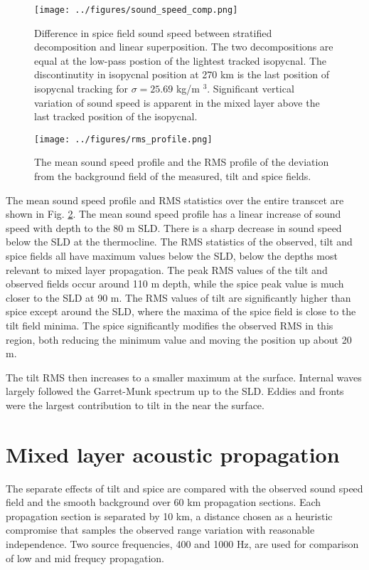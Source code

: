 \documentclass[preprint,NumberedRefs]{JASA}
\begin{document}
\begin{figure}
\texttt{[image: ../figures/sound\_speed\_comp.png]}
    \caption{\label{fig:c_diff}{Difference in spice field sound speed between stratified decomposition and linear superposition. The two decompositions are equal at the low-pass postion of the lightest tracked isopycnal. The discontinutity in isopycnal position at 270 km is the last position of isopycnal tracking for $\sigma=25.69$ kg/m $^3$. Significant vertical variation of sound speed is apparent in the mixed layer above the last tracked position of the isopycnal.}}
\end{figure}


\begin{figure}
\texttt{[image: ../figures/rms\_profile.png]}
    \caption{\label{fig:c_rms}{The mean sound speed profile and the RMS profile of the deviation from the background field of the measured, tilt and spice fields. }}
\end{figure}

The mean sound speed profile and RMS statistics over the entire transcet are shown in Fig. \ref{fig:c_rms}. The mean sound speed profile has a linear increase of sound speed with depth to the 80 m SLD. There is a sharp decrease in sound speed below the SLD at the thermocline. The RMS statistics of the observed, tilt and spice fields all have maximum values below the SLD, below the depths most relevant to mixed layer propagation. The peak RMS values of the tilt and observed fields occur around 110 m depth, while the spice peak value is much closer to the SLD at 90 m. The RMS values of tilt are significantly higher than spice except around the SLD, where the maxima of the spice field is close to the tilt field minima. The spice significantly modifies the observed RMS  in this region, both reducing the minimum value and moving the position up about 20 m.

The tilt RMS then increases to a smaller maximum at the surface. Internal waves largely followed the Garret-Munk spectrum up to the SLD. Eddies and fronts were the largest contribution to tilt in the near the surface.

\section{\label{sec:propagation}Mixed layer acoustic propagation}
The separate effects of tilt and spice are compared with the observed sound speed field and the smooth background over 60 km propagation sections. Each propagation section is separated by 10 km, a distance chosen as a heuristic compromise that samples the observed range variation with reasonable independence. Two source frequencies, 400 and 1000 Hz, are used for comparison of low and mid frequcy propagation.
\end{document}
